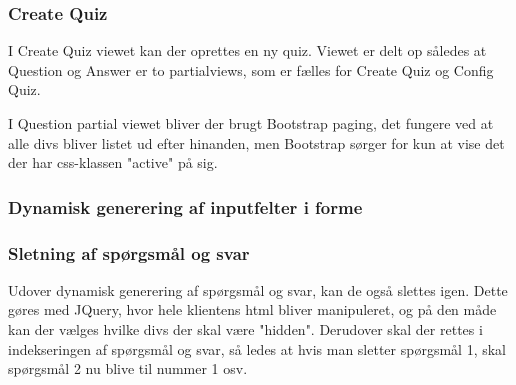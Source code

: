\subsubsection{Create Quiz}
I Create Quiz viewet kan der oprettes en ny quiz. Viewet er delt op således at Question og Answer er to partialviews, som er fælles for Create Quiz og Config Quiz.

I Question partial viewet bliver der brugt Bootstrap paging, det fungere ved at alle divs bliver listet ud efter hinanden, men Bootstrap sørger for kun at vise det der har css-klassen "active" på sig.

\subsubsection*{Dynamisk generering af inputfelter i forme}

\subsubsection*{Sletning af spørgsmål og svar}
Udover dynamisk generering af spørgsmål og svar, kan de også slettes igen. Dette gøres med JQuery, hvor hele klientens html bliver manipuleret, og på den måde kan der vælges hvilke divs der skal være "hidden". Derudover skal der rettes i indekseringen af spørgsmål og svar, så ledes at hvis man sletter spørgsmål 1, skal spørgsmål 2 nu blive til nummer 1 osv.